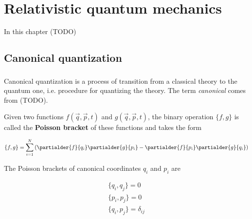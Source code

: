 \chapter{Relativistic quantum mechanics}

In this chapter (TODO)

\section{Canonical quantization}

\paragraph{} Canonical quantization is a process of transition from a classical theory to
the quantum one, i.e. procedure for quantizing the theory. The term \textit{canonical} comes
from (TODO).

\begin{definition}
    \label{df:poisson}
    Given two functions $f(\vec{q}, \vec{p}, t)$ and $g(\vec{q}, \vec{p}, t)$, the binary operation
    $\{f, g\}$ is called the \textbf{Poisson bracket} of these functions and takes the form

    \begin{equation}
        \{f, g\} = \sum_{i=1}^{N}\left(\partialder{f}{q_{i}} \partialder{g}{p_{i}} - \partialder{f}{p_{i}} \partialder{g}{q_{i}}\right)
    \end{equation}
\end{definition}

\begin{theorem}
    \label{th:poisson_cononical_coordinates}
    The Poisson brackets of canonical coordinates $q_{i}$ and $p_{i}$ are

    \begin{equation}
        \begin{gathered}
        \{q_{i}, q_{j}\} = 0 \\
        \{p_{i}, p_{j}\} = 0 \\
        \{q_{i}, p_{j}\} = \delta_{ij}
        \end{gathered}
    \end{equation}
\end{theorem}

